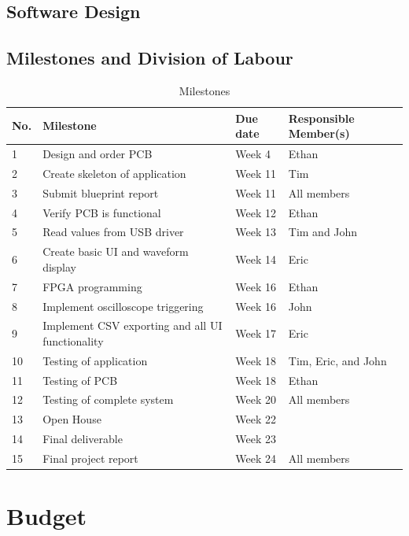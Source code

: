 \documentclass[letterpaper,12pt]{article}
\begin{document}
\subsection{Software Design}
\subsection{Milestones and Division of Labour}
\begin{table}[h!]
    \caption{Milestones}
    \begin{tabularx}{\textwidth}{l|l|l|l}
        No. & Milestone & Due date & Responsible Member(s) \\
        \hline
        1 & Design and order PCB & Week 4 & Ethan \\
        2 & Create skeleton of application & Week 11 & Tim \\
        3 & Submit blueprint report & Week 11 & All members \\
        4 & Verify PCB is functional & Week 12 & Ethan \\
        5 & Read values from USB driver & Week 13 & Tim and John \\
        6 & Create basic UI and waveform display & Week 14 & Eric \\
        7 & FPGA programming & Week 16 & Ethan \\
        8 & Implement oscilloscope triggering & Week 16 & John \\
        9 & Implement CSV exporting and all UI functionality & Week 17 & Eric \\
        10 & Testing of application & Week 18 & Tim, Eric, and John \\
        11 & Testing of PCB & Week 18 & Ethan \\
        12 & Testing of complete system & Week 20 & All members \\
        13 & Open House & Week 22 & \\
        14 & Final deliverable & Week 23 & \\
        15 & Final project report & Week 24 & All members
    \end{tabularx} 
\label{hw:milestones-table}
\end{table}
\section{Budget} %
\end{document}
